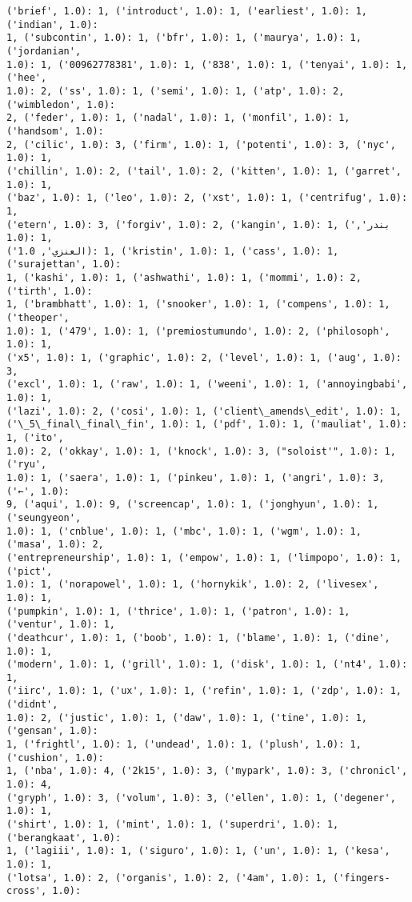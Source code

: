 \documentclass[11pt]{article}
\begin{document}
\begin{Verbatim}[commandchars=\\\{\}]
('brief', 1.0): 1, ('introduct', 1.0): 1, ('earliest', 1.0): 1, ('indian', 1.0):
1, ('subcontin', 1.0): 1, ('bfr', 1.0): 1, ('maurya', 1.0): 1, ('jordanian',
1.0): 1, ('00962778381', 1.0): 1, ('838', 1.0): 1, ('tenyai', 1.0): 1, ('hee',
1.0): 2, ('ss', 1.0): 1, ('semi', 1.0): 1, ('atp', 1.0): 2, ('wimbledon', 1.0):
2, ('feder', 1.0): 1, ('nadal', 1.0): 1, ('monfil', 1.0): 1, ('handsom', 1.0):
2, ('cilic', 1.0): 3, ('firm', 1.0): 1, ('potenti', 1.0): 3, ('nyc', 1.0): 1,
('chillin', 1.0): 2, ('tail', 1.0): 2, ('kitten', 1.0): 1, ('garret', 1.0): 1,
('baz', 1.0): 1, ('leo', 1.0): 2, ('xst', 1.0): 1, ('centrifug', 1.0): 1,
('etern', 1.0): 3, ('forgiv', 1.0): 2, ('kangin', 1.0): 1, ('بندر', 1.0): 1,
('العنزي', 1.0): 1, ('kristin', 1.0): 1, ('cass', 1.0): 1, ('surajettan', 1.0):
1, ('kashi', 1.0): 1, ('ashwathi', 1.0): 1, ('mommi', 1.0): 2, ('tirth', 1.0):
1, ('brambhatt', 1.0): 1, ('snooker', 1.0): 1, ('compens', 1.0): 1, ('theoper',
1.0): 1, ('479', 1.0): 1, ('premiostumundo', 1.0): 2, ('philosoph', 1.0): 1,
('x5', 1.0): 1, ('graphic', 1.0): 2, ('level', 1.0): 1, ('aug', 1.0): 3,
('excl', 1.0): 1, ('raw', 1.0): 1, ('weeni', 1.0): 1, ('annoyingbabi', 1.0): 1,
('lazi', 1.0): 2, ('cosi', 1.0): 1, ('client\_amends\_edit', 1.0): 1,
('\_5\_final\_final\_fin', 1.0): 1, ('pdf', 1.0): 1, ('mauliat', 1.0): 1, ('ito',
1.0): 2, ('okkay', 1.0): 1, ('knock', 1.0): 3, ("soloist'", 1.0): 1, ('ryu',
1.0): 1, ('saera', 1.0): 1, ('pinkeu', 1.0): 1, ('angri', 1.0): 3, ('←', 1.0):
9, ('aqui', 1.0): 9, ('screencap', 1.0): 1, ('jonghyun', 1.0): 1, ('seungyeon',
1.0): 1, ('cnblue', 1.0): 1, ('mbc', 1.0): 1, ('wgm', 1.0): 1, ('masa', 1.0): 2,
('entrepreneurship', 1.0): 1, ('empow', 1.0): 1, ('limpopo', 1.0): 1, ('pict',
1.0): 1, ('norapowel', 1.0): 1, ('hornykik', 1.0): 2, ('livesex', 1.0): 1,
('pumpkin', 1.0): 1, ('thrice', 1.0): 1, ('patron', 1.0): 1, ('ventur', 1.0): 1,
('deathcur', 1.0): 1, ('boob', 1.0): 1, ('blame', 1.0): 1, ('dine', 1.0): 1,
('modern', 1.0): 1, ('grill', 1.0): 1, ('disk', 1.0): 1, ('nt4', 1.0): 1,
('iirc', 1.0): 1, ('ux', 1.0): 1, ('refin', 1.0): 1, ('zdp', 1.0): 1, ('didnt',
1.0): 2, ('justic', 1.0): 1, ('daw', 1.0): 1, ('tine', 1.0): 1, ('gensan', 1.0):
1, ('frightl', 1.0): 1, ('undead', 1.0): 1, ('plush', 1.0): 1, ('cushion', 1.0):
1, ('nba', 1.0): 4, ('2k15', 1.0): 3, ('mypark', 1.0): 3, ('chronicl', 1.0): 4,
('gryph', 1.0): 3, ('volum', 1.0): 3, ('ellen', 1.0): 1, ('degener', 1.0): 1,
('shirt', 1.0): 1, ('mint', 1.0): 1, ('superdri', 1.0): 1, ('berangkaat', 1.0):
1, ('lagiii', 1.0): 1, ('siguro', 1.0): 1, ('un', 1.0): 1, ('kesa', 1.0): 1,
('lotsa', 1.0): 2, ('organis', 1.0): 2, ('4am', 1.0): 1, ('fingers-cross', 1.0):

\end{Verbatim}
\end{document}
